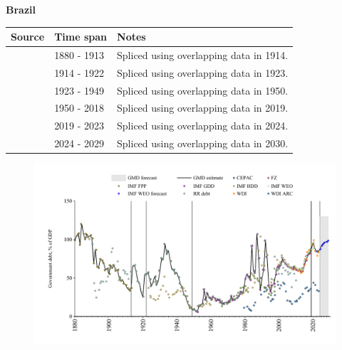 \documentclass[12pt,a4paper,landscape]{article}
\begin{document}
\begin{adjustbox}{max totalsize={\paperwidth}{\paperheight},center}
\begin{minipage}[t][\textheight][t]{\textwidth}
\vspace*{0.5cm}
{}
\begin{center}
{\Large\bfseries Brazil}
\end{center}
\vspace{0.5cm}
\begin{table}[H]
\centering
\small
\begin{tabular}{|l|l|l|}
\hline
\textbf{Source} & \textbf{Time span} & \textbf{Notes} \\
\hline
\rowcolor{white}\cite{IMF_FPP}& 1880 - 1913 &Spliced using overlapping data in 1914.\\
\rowcolor{lightgray}\cite{RR_debt}& 1914 - 1922 &Spliced using overlapping data in 1923.\\
\rowcolor{white}\cite{IMF_FPP}& 1923 - 1949 &Spliced using overlapping data in 1950.\\
\rowcolor{lightgray}\cite{IMF_GDD}& 1950 - 2018 &Spliced using overlapping data in 2019.\\
\rowcolor{white}\cite{IMF_FPP}& 2019 - 2023 &Spliced using overlapping data in 2024.\\
\rowcolor{lightgray}\cite{IMF_WEO_forecast}& 2024 - 2029 &Spliced using overlapping data in 2030.\\
\hline
\end{tabular}
\end{table}
\begin{figure}[H]
\centering
\includegraphics[width=\textwidth,height=0.6\textheight,keepaspectratio]{graphs/BRA_govdebt_GDP.pdf}
\end{figure}
\end{minipage}
\end{adjustbox}
\end{document}
